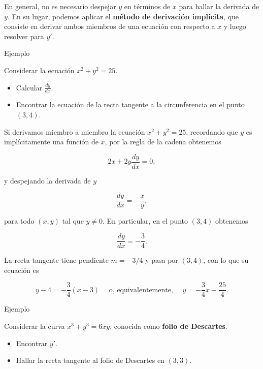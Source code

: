 \documentclass[
  letterpaper,
]{book}
\providecommand{\tightlist}{%
  \setlength{\itemsep}{0pt}\setlength{\parskip}{0pt}}
\theoremstyle{plain}
\theoremstyle{remark}
\begin{document}
En general, no es necesario despejar \(y\) en términos de \(x\) para
hallar la derivada de \(y\). En su lugar, podemos aplicar el
\textbf{método de derivación implícita}, que consiste en derivar ambos
miembros de una ecuación con respecto a \(x\) y luego resolver para
\(y'\).

Ejemplo

Considerar la ecuación \(x^2+y^2=25\).

\begin{itemize}
\tightlist
\item
  Calcular \(\displaystyle\frac{dy}{dx}\).
\item
  Encontrar la ecuación de la recta tangente a la circunferencia en el
  punto \((3,4)\).
\end{itemize}

\begin{tcolorbox}[enhanced jigsaw, opacityback=0, left=2mm, opacitybacktitle=0.6, toprule=.15mm, bottomrule=.15mm, colbacktitle=quarto-callout-tip-color!10!white, titlerule=0mm, bottomtitle=1mm, title=\textcolor{quarto-callout-tip-color}{\faLightbulb}\hspace{0.5em}{Solución}, toptitle=1mm, colframe=quarto-callout-tip-color-frame, colback=white, breakable, rightrule=.15mm, arc=.35mm, leftrule=.75mm, coltitle=black]

Si derivamos miembro a miembro la ecuación \(x^2+y^2=25\), recordando
que \(y\) es implícitamente una función de \(x\), por la regla de la
cadena obtenemos

\[
2x+2y\frac{dy}{dx}=0,
\]

y despejando la derivada de \(y\)

\[
\frac{dy}{dx}=-\frac{x}{y},
\]

para todo \((x,y)\) tal que \(y\neq 0\). En particular, en el punto
\((3,4)\) obtenemos

\[
\frac{dy}{dx}=-\frac{3}{4}.
\]

La recta tangente tiene pendiente \(m=-3/4\) y pasa por \((3,4)\), con
lo que su ecuación es

\[
y-4=-\frac{3}{4}(x-3) \quad \text{ o, equivalentemente, } \quad y=-\frac{3}{4}x+\frac{25}{4}.
\]

\end{tcolorbox}

Ejemplo

Considerar la curva \(x^3+y^3=6xy\), conocida como \textbf{folio de
Descartes}.

\begin{itemize}
\tightlist
\item
  Encontrar \(y'\).
\item
  Hallar la recta tangente al folio de Descartes en \((3,3)\).
\end{itemize}
\end{document}
